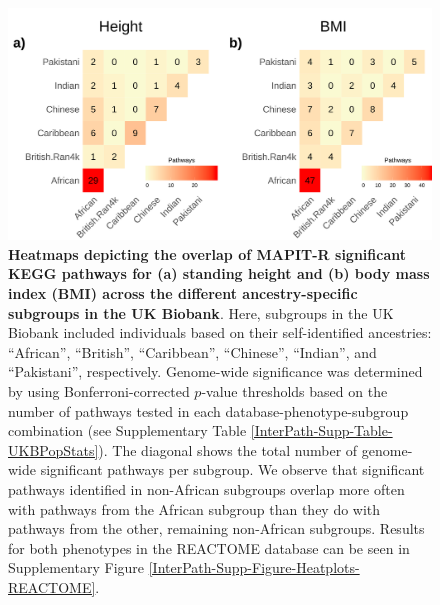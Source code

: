\documentclass[10pt]{article}
\begin{document}
\begin{figure}[htb]
\centering
\includegraphics[width=\textwidth]{Images/Main/InterPath_Main_Figure_Heatplots_KEGG_vs4.png}
\caption{\textbf{Heatmaps depicting the overlap of MAPIT-R significant KEGG pathways for (a) standing height and (b) body mass index (BMI) across the different ancestry-specific subgroups in the UK Biobank}. Here, subgroups in the UK Biobank included individuals based on their self-identified ancestries: ``African'', ``British'', ``Caribbean'', ``Chinese'', ``Indian'', and ``Pakistani'', respectively. Genome-wide significance was determined by using Bonferroni-corrected $p$-value thresholds based on the number of pathways tested in each database-phenotype-subgroup combination (see Supplementary Table \ref{InterPath-Supp-Table-UKBPopStats}). The diagonal shows the total number of genome-wide significant pathways per subgroup. We observe that significant pathways identified in non-African subgroups overlap more often with pathways from the African subgroup than they do with pathways from the other, remaining non-African subgroups. Results for both phenotypes in the REACTOME database can be seen in Supplementary Figure \ref{InterPath-Supp-Figure-Heatplots-REACTOME}.}
\label{InterPath-Main-Figure-Heatplots-KEGG}
\end{figure}

\end{document}
